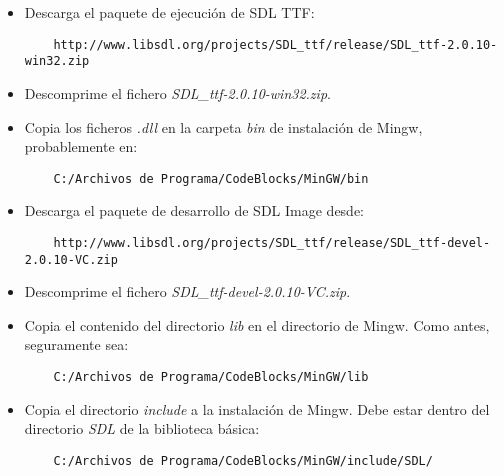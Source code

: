 \documentclass[16pt,spanish]{article}
\begin{document}
\begin{itemize}
	\item Descarga el paquete de ejecución de SDL TTF:
	\begin{verbatim}
	http://www.libsdl.org/projects/SDL_ttf/release/SDL_ttf-2.0.10-win32.zip
	\end{verbatim}
	\item Descomprime el fichero \emph{SDL\_ttf-2.0.10-win32.zip}.
	\item Copia los ficheros \emph{.dll} en la carpeta \emph{bin} de instalación
	de Mingw, probablemente en:
	\begin{verbatim}
	C:/Archivos de Programa/CodeBlocks/MinGW/bin
	\end{verbatim}
	\item Descarga el paquete de desarrollo de SDL Image desde:
	\begin{verbatim}
	http://www.libsdl.org/projects/SDL_ttf/release/SDL_ttf-devel-2.0.10-VC.zip
	\end{verbatim}
	\item Descomprime el fichero \emph{SDL\_ttf-devel-2.0.10-VC.zip}.
	\item Copia el contenido del directorio \emph{lib} en el directorio
	de Mingw. Como antes, seguramente sea:
	\begin{verbatim}
	C:/Archivos de Programa/CodeBlocks/MinGW/lib
	\end{verbatim}
	\item Copia el directorio \emph{include} a la instalación de Mingw.
	Debe estar dentro del directorio \emph{SDL} de la biblioteca básica:
	\begin{verbatim}
	C:/Archivos de Programa/CodeBlocks/MinGW/include/SDL/
	\end{verbatim}
\end{itemize}
\end{document}
